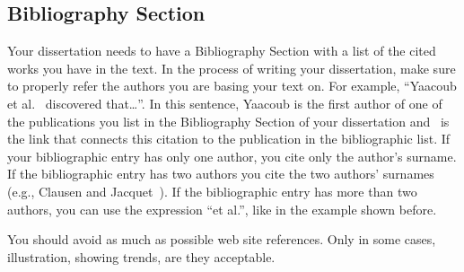 \subsection{Bibliography Section}
Your dissertation needs to have a Bibliography Section with a list of the cited works you have in
the text. In the process of writing your dissertation, make sure to properly refer the authors you are
basing your text on. For example, “Yaacoub et al.~\cite{yaacoub2012} discovered that\ldots”. In this sentence, Yaacoub is the
first author of one of the publications you list in the Bibliography Section of your dissertation and~\cite{yaacoub2012} is the link that connects this citation to the publication in the bibliographic list. If your
bibliographic entry has only one author, you cite only the author's surname. If the bibliographic
entry has two authors you cite the two authors' surnames (e.g., Clausen and Jacquet~\cite{Clausen2003}). If the
bibliographic entry has more than two authors, you can use the expression “et al.”, like in the
example shown before.

You should avoid as much as possible web site references. Only in some cases, illustration, showing trends, are they acceptable.

